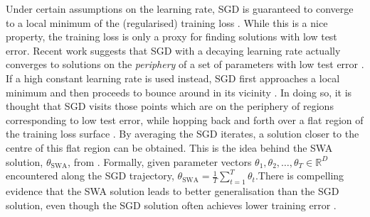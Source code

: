 \documentclass[msc,deptreport.inf]{infthesis} %
\newcommand{\R}{\mathbb R}
\begin{document}
Under certain assumptions on the learning rate, SGD is guaranteed to converge to a local minimum of the (regularised) training loss \cite{ruder2016}. While this is a nice property, the training loss is only a proxy for finding solutions with low test error. Recent work suggests that SGD with a decaying learning rate actually converges to solutions on the \emph{periphery} of a set of parameters with low test error \cite{izmailov2018}. If a high constant learning rate is used instead, SGD first approaches a local minimum and then proceeds to bounce around in its vicinity \cite{mandt2017}. In doing so, it is thought that SGD visits those points which are on the periphery of regions corresponding to low test error, while hopping back and forth over a flat region of the training loss surface \cite{izmailov2018}. By averaging the SGD iterates, a solution closer to the centre of this flat region can be obtained. This is the idea behind the SWA solution, $\theta_{\text{SWA}}$, from \cite{izmailov2018}. Formally, given parameter vectors $\theta_1, \theta_2, \dots, \theta_T \in \R^D$ encountered along the SGD trajectory, $\theta_{\text{SWA}} = \frac{1}{T}\sum_{t=1}^T \theta_t$.There is compelling evidence that the SWA solution leads to better generalisation than the SGD solution, even though the SGD solution often achieves lower training error \cite{izmailov2018}. 
\end{document}
